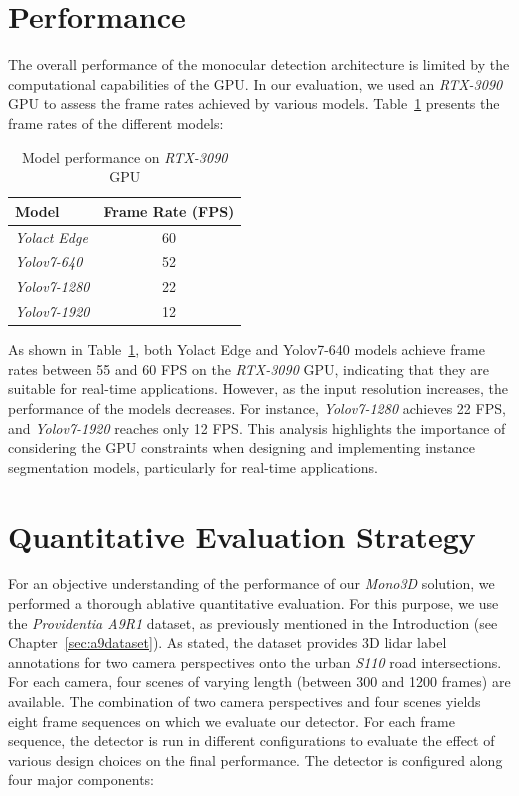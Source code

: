
\section{Performance}
\label{sec:performance}

The overall performance of the monocular detection architecture is limited by the computational capabilities of the GPU. In our evaluation, we used an \textit{RTX-3090} GPU to assess the frame rates achieved by various models.
Table~\ref{tbl:gpu-performance} presents the frame rates of the different models:

\begin{table}[ht]
\centering
\caption{Model performance on \textit{RTX-3090} GPU}
\begin{tabular}{|l|c|}
\hline
\textbf{Model} & \textbf{Frame Rate (FPS)} \\
\hline
\textit{Yolact Edge} & 60 \\
\textit{Yolov7-640} & 52 \\
\textit{Yolov7-1280} & 22 \\
\textit{Yolov7-1920} & 12 \\
\hline
\end{tabular}
\label{tbl:gpu-performance}
\end{table}

As shown in Table~\ref{tbl:gpu-performance}, both Yolact Edge and Yolov7-640 models achieve frame rates between 55 and 60 FPS on the \textit{RTX-3090} GPU, indicating that they are suitable for real-time applications.
However, as the input resolution increases, the performance of the models decreases.
For instance, \textit{Yolov7-1280} achieves 22 FPS, and \textit{Yolov7-1920} reaches only 12 FPS.
This analysis highlights the importance of considering the GPU constraints when designing and implementing instance segmentation models, particularly for real-time applications.


\section{Quantitative Evaluation Strategy}
\label{sec:quant}

For an objective understanding of the performance of our \textit{Mono3D} solution, we performed a thorough ablative quantitative evaluation.
For this purpose, we use the \textit{Providentia A9R1} dataset, as previously mentioned in the Introduction (see Chapter~\ref{sec:a9dataset}).
As stated, the dataset provides 3D lidar label annotations for two camera perspectives onto the urban \textit{S110} road intersections.
For each camera, four scenes of varying length (between 300 and 1200 frames) are available.
The combination of two camera perspectives and four scenes yields eight frame sequences on which we evaluate our detector.
For each frame sequence, the detector is run in different configurations to evaluate the effect of various design choices on the final performance.
The detector is configured along four major components:

